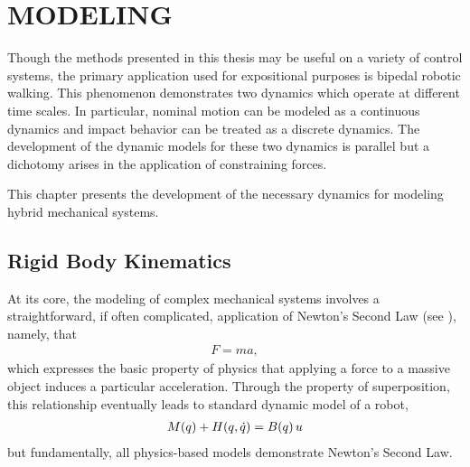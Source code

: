 \chapter{\uppercase{Modeling}}

Though the methods presented in this thesis may be useful on a variety of control systems, the primary application used for expositional purposes is bipedal robotic walking.
%
This phenomenon demonstrates two dynamics which operate at different time scales.
%
In particular, nominal motion can be modeled as a continuous dynamics and impact behavior can be treated as a discrete dynamics.
%
The development of the dynamic models for these two dynamics is parallel but a dichotomy arises in the application of constraining forces.

This chapter presents the development of the necessary dynamics for modeling hybrid mechanical systems.


\section{Rigid Body Kinematics}

At its core, the modeling of complex mechanical systems involves a straightforward, if often complicated, application of Newton's Second Law (see \cite{feynman1963}), namely,
that
\begin{align}
  \label{eq:newtons-second}
  F = m a,
\end{align}
which expresses the basic property of physics that applying a force to a massive object induces a particular acceleration.
%
Through the property of superposition, this relationship eventually leads to standard dynamic model of a robot,
\begin{align}
  M(q) + H(q, \dot{q}) = B(q) \, u
\end{align}
but fundamentally, all physics-based models demonstrate Newton's Second Law.


